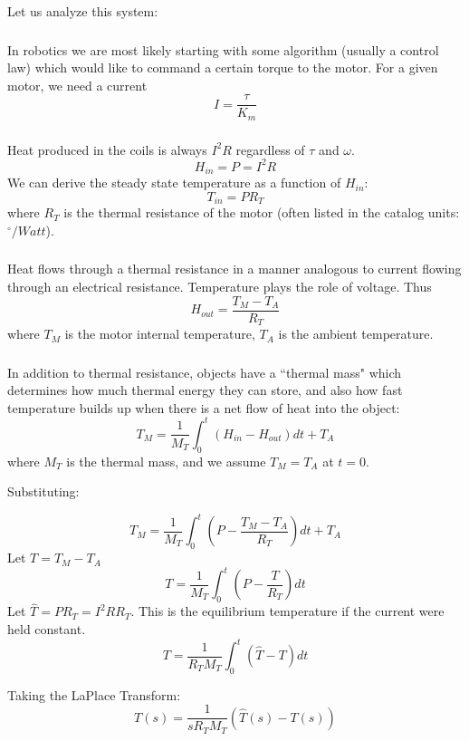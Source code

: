 Let us analyze this system:

\subsubsection{}

In robotics we are most likely starting with some algorithm (usually
a control law) which would like to command a certain torque to the
motor.
For a given motor, we need a current
\[
I = \frac{\tau}{K_m}
\]

\subsubsection{}
Heat produced in the coils is always $I^2R$ regardless of $\tau$ and $\omega$.
\[
H_{in} = P = I^2R
\]
We can derive the steady state temperature as a function of $H_{in}$:
\[
T_{in} = P R_T
\]
where $R_T$ is the thermal resistance of the motor (often listed in the
catalog units: $^{\circ}/Watt$).


\subsubsection{}
Heat flows through a thermal resistance in a manner analogous to
current flowing through an electrical resistance.  Temperature plays the
role of voltage.  Thus
\[
H_{out} = \frac{T_M - T_A}{R_T}
\]
where $T_M$ is the motor internal temperature, $T_A$ is the ambient
temperature.

\subsubsection{}
In addition to thermal resistance, objects have a ``thermal mass" which
determines how much thermal energy they can store, and also how fast
temperature builds up when there is a net flow of heat into the object:
\[
T_M = \frac{1}{M_T}\int^t_0 (H_{in} - H_{out}) dt + T_A
\]
where $M_T$ is the thermal mass, and we assume $T_M = T_A$ at $t=0$.

Substituting:

\[
T_M = \frac{1}{M_T}\int^t_0 (P - \frac{T_M - T_A}{R_T} ) dt + T_A
\]
Let $T = T_M - T_A$
\[
T = \frac{1}{M_T}\int^t_0 (P - \frac{T}{R_T} ) dt
\]
Let $\hat{T} = PR_T = I^2RR_T$.  This is the equilibrium temperature if the current
were held constant.
\[
T = \frac{1}{R_TM_T}\int^t_0 (\hat{T}-T ) dt
\]

Taking the LaPlace Transform:
\[
T(s) = \frac{1}{sR_TM_T}(\hat{T}(s) - T(s))
\]

